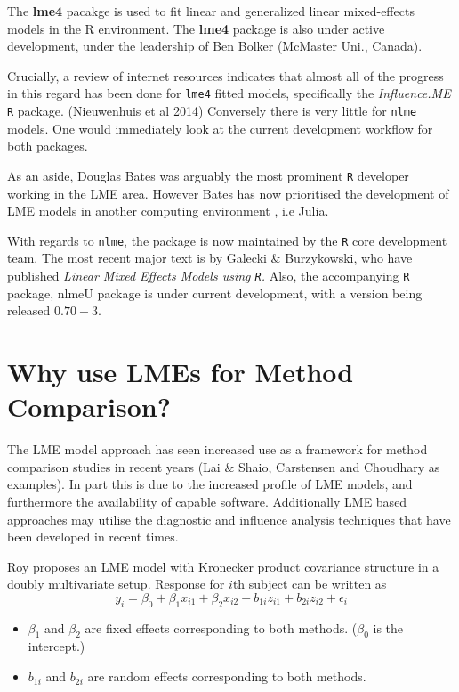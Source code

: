 \documentclass[12pt, a4paper]{report}
\theoremstyle{plain}
\theoremstyle{definition}
\theoremstyle{remark}
\begin{document}
	
	The \textbf{lme4} pacakge is used to fit linear and generalized linear mixed-effects models in the R environment.
	The \textbf{lme4} package is also under active development, under the leadership of Ben Bolker (McMaster Uni., Canada).
	
	
	Crucially, a review of internet resources indicates that almost all of the progress in this regard has been done for \texttt{lme4} fitted models, specifically the \textit{Influence.ME} \texttt{R} package. (Nieuwenhuis et al 2014)
	Conversely there is very little for \texttt{nlme} models. One would immediately look at the current development workflow for both packages.
	
	
	As an aside, Douglas Bates was arguably the most prominent \texttt{R} developer working in the LME area. 
	However Bates has now prioritised the development of LME models in another computing environment , i.e Julia. 
	
	
	With regards to \texttt{nlme}, the package is now maintained by the \texttt{R} core development team. The most recent major text is by Galecki \& Burzykowski, who have published \textit{ Linear Mixed Effects Models using \texttt{R}. }
	Also, the accompanying \texttt{R} package, nlmeU package is under current development, with a version being released $0.70-3$.
	
	
	


	\section{Why use LMEs for Method Comparison?}
	The LME model approach has seen increased use as a framework for method comparison studies in recent years (Lai $\&$ Shaio, Carstensen and Choudhary as examples). In part this is due to the increased profile of LME models, and furthermore the availability of capable software. Additionally LME based approaches may utilise the diagnostic and influence analysis techniques that have been developed in recent times.
	
	
	Roy proposes an LME model with Kronecker product covariance structure in a doubly multivariate setup. Response for $i$th subject can be written as
	\[ y_i = \beta_0 + \beta_1x_{i1} + \beta_2x_{i2} + b_{1i}z_{i1}  + b_{2i}z_{i2} + \epsilon_i \]
	\begin{itemize}
		\item $\beta_1$ and $\beta_2$ are fixed effects corresponding to both methods. ($\beta_0$ is the intercept.)
		\item $b_{1i}$ and $b_{2i}$ are random effects corresponding to both methods.
	\end{itemize}
	
\end{document}
